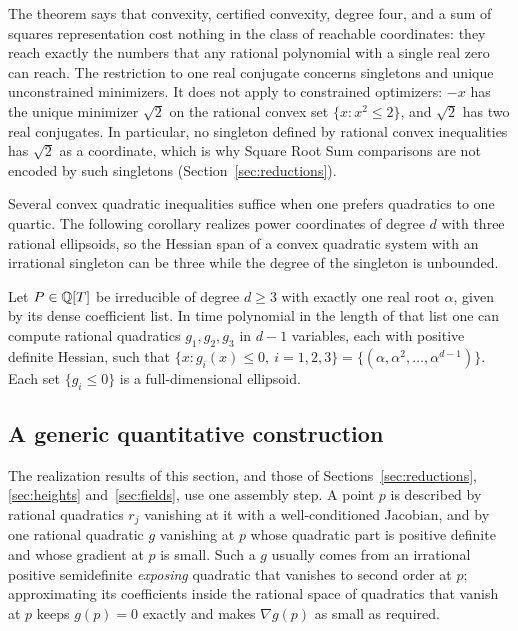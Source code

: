 The theorem says that convexity, certified convexity, degree four, and a sum
of squares representation cost nothing in the class of reachable coordinates:
they reach exactly the numbers that any rational polynomial with a single real
zero can reach. The restriction to one real conjugate concerns singletons and
unique unconstrained minimizers. It does not apply to constrained optimizers:
$-x$ has the unique minimizer $\sqrt2$ on the rational convex set
$\{x:x^2\le2\}$, and $\sqrt2$ has two real conjugates. In particular, no
singleton defined by rational convex inequalities has $\sqrt2$ as a
coordinate, which is why Square Root Sum comparisons are not encoded by such
singletons (Section~\ref{sec:reductions}).

Several convex quadratic inequalities suffice when one prefers quadratics to
one quartic. The following corollary realizes power coordinates of degree $d$
with three rational ellipsoids, so the Hessian span of a convex quadratic
system with an irrational singleton can be three while the degree of the
singleton is unbounded.

\begin{corollary}
\label{cor:algebraic-three-quadrics}
Let $P\in\mathbb Q[T]$ be irreducible of degree $d\ge3$ with exactly one real root
$\alpha$, given by its dense coefficient list. In time polynomial in the
length of that list one can compute rational quadratics $g_1,g_2,g_3$ in $d-1$
variables, each with positive definite Hessian, such that
$\{x:g_i(x)\le0,\ i=1,2,3\}=\{(\alpha,\alpha^2,\ldots,\alpha^{d-1})\}$. Each
set $\{g_i\le0\}$ is a full-dimensional ellipsoid.
\end{corollary}

\subsection{A generic quantitative construction}
\label{sec:algebraic-realization}

The realization results of this section, and those of
Sections~\ref{sec:reductions}, \ref{sec:heights} and~\ref{sec:fields}, use
one assembly step. A point $p$ is
described by rational quadratics $r_j$ vanishing at it with a well-conditioned
Jacobian, and by one rational quadratic $g$ vanishing at $p$ whose quadratic
part is positive definite and whose gradient at $p$ is small. Such a $g$
usually comes from an irrational positive semidefinite \emph{exposing}
quadratic that vanishes to second order at $p$; approximating its coefficients
inside the rational space of quadratics that vanish at $p$ keeps $g(p)=0$
exactly and makes $\nabla g(p)$ as small as required.

